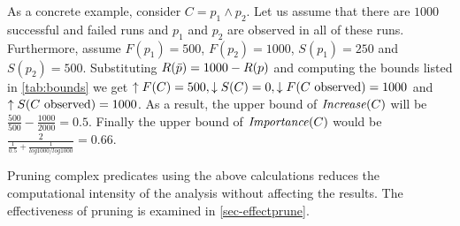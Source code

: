 As a concrete example, consider $C = p_1 \wedge p_2$.  Let us assume that there are $1000$
successful and failed runs and $p_1$ and $p_2$ are observed in all of these runs.
Furthermore, assume
$F(p_1) = 500$, $F(p_2) = 1000$, $S(p_1) = 250$ and $S(p_2) = 500$.
Substituting $R(\text{$\bar{p}$}) = 1000 - R(p)$ and computing the bounds listed in
\autoref{tab:bounds} we get $\uparrow F(C) = 500, \downarrow S(C) = 0, \downarrow F(\text{$C$ observed}) = 1000$ and
$\uparrow S(\text{$C$ observed}) = 1000$.  As a result, the upper bound of $\mathit{Increase}(C)$ will be 
$\frac{500}{500} - \frac{1000}{2000}=0.5$. Finally the upper bound of $\mathit{Importance}(C)$ would be $\frac{2}{\frac{1}{0.5}+\frac{1}{log1000/log1000}} = 0.66$. 

Pruning complex predicates using the above calculations reduces the computational intensity of the analysis without affecting the results.  The effectiveness of pruning is examined in \autoref{sec-effectprune}.

